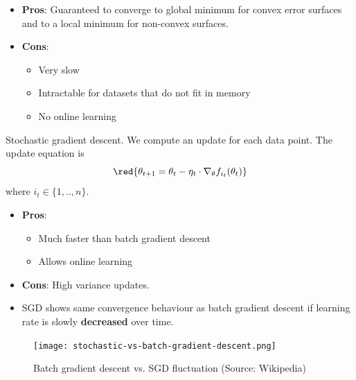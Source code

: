 \documentclass[english]{article}
\begin{document}
\begin{itemize}
\item \textbf{Pros}: Guaranteed to converge to global minimum for convex error surfaces and to a local minimum for non-convex surfaces.
\item \textbf{Cons}:
\begin{itemize}
\item Very slow
\item Intractable for datasets that do not fit in memory
\item No online learning
\end{itemize}
\end{itemize}







\item {Stochastic gradient descent}.
We compute an update for each data point. The update equation is
$$\red{\theta_{t+1} = \theta_t - \eta_t \cdot \nabla_\theta f_{i_t}(\theta_t)}$$
where $i_t \in \{1,.., n\}$.

\begin{itemize}
\item \textbf{Pros}:
\begin{itemize}
\item Much faster than batch gradient descent
\item Allows online learning
\end{itemize}
\item \textbf{Cons}: High variance updates.

\item SGD shows same convergence behaviour as batch gradient descent if
learning rate is slowly \textbf{decreased} over time.
\end{itemize}






\begin{figure}
\begin{center}
\caption{Batch gradient descent vs. SGD fluctuation (Source: Wikipedia)}
\texttt{[image: stochastic-vs-batch-gradient-descent.png]}
    \label{Batch gradient descent vs. SGD fluctuation}
\end{center}
\end{figure}



\end{document}
